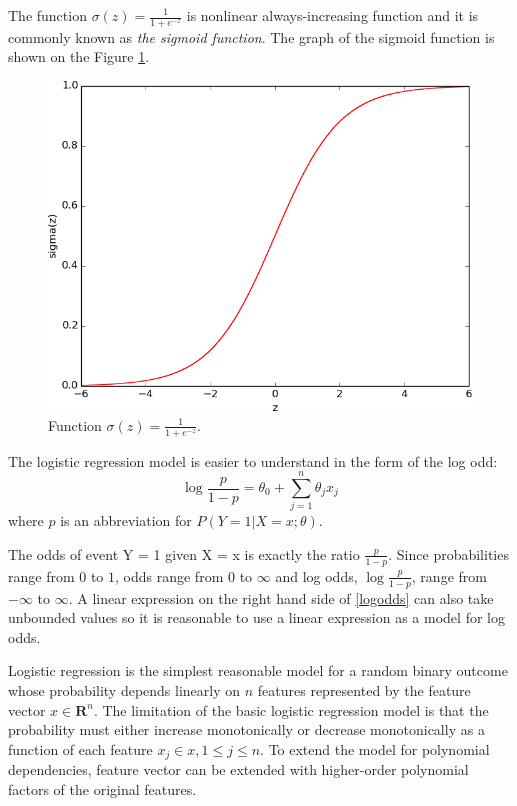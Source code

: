 \documentclass[times, utf8, zavrsni]{fer}
\begin{document}
The function $\sigma(z) = \frac{1}{1 + e ^ {-z}}$ is nonlinear always-increasing function  and it is commonly known as \emph{the sigmoid function}. The graph of the sigmoid function is shown on the Figure \ref{sig}.
\begin{figure}[htp]
\centering
\includegraphics[scale=0.59]{sig.png}
\caption{Function $\sigma(z) = \frac{1}{1 + e ^ {-z}}$.}
\label{sig}
\end{figure}

The logistic  regression model is easier to understand in the form of the log odd:
\begin{equation}
\log \frac{p}{1 - p} = \theta_0 + \sum_{j = 1}^n \theta_j x_j
\label{logodds}
\end{equation}
where $p$ is an abbreviation for $P(Y = 1 | X =x; \theta)$.

The odds of event Y = 1 given  X = x is exactly the ratio $\frac{p}{1 - p}$.  Since probabilities range from $0$ to $1$, odds range from $0$ to $\infty$ and log odds, $\log\frac{p}{1 - p}$, range from $-\infty$ to $\infty$. A linear expression on the right hand side of \eqref{logodds} can also take unbounded values so it is reasonable to use  a linear  expression as a model for log odds.

Logistic regression is the simplest reasonable model for a random binary outcome whose probability depends linearly on $n$ features represented by the feature vector $x \in \mathbf{R}^n$.  The limitation of the basic logistic regression model is that the probability must either increase monotonically or decrease monotonically as a function of each feature $x_j \in x, 1 \leq j \leq n$. To extend the model for polynomial dependencies, feature vector can be extended with higher-order polynomial factors of the original features. 
\end{document}
